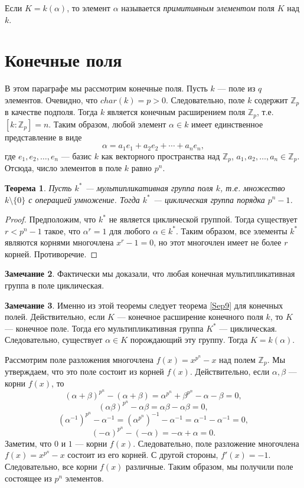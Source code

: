 \documentclass[12pt, titlepage, oneside]{amsbook}
\newcommand{\ZZ}{\mathbb{Z}}
\newtheorem{theorem}{Теорема}[chapter]
\theoremstyle{definition}
\newtheorem{remark}[theorem]{Замечание}
\theoremstyle{remark}
\begin{document}
Если $K=k(\alpha)$, то элемент $\alpha$ называется \emph{примитивным элементом} поля $K$ над $k$.

\section{Конечные поля}

В этом параграфе мы рассмотрим конечные поля. Пусть $k$ --- поле из $q$ элементов. Очевидно, что $char(k)=p>0$. Следовательно, поле $k$ содержит $\ZZ_p$ в качестве подполя. Тогда $k$ является конечным расширением поля $\ZZ_p$, т.е. $[k:\ZZ_p]=n$. Таким образом, любой элемент $\alpha\in k$ имеет единственное представление в виде $$\alpha=a_1e_1+a_2e_2+\cdots+a_ne_n,$$ где $e_1,e_2,\ldots,e_n$ --- базис $k$ как векторного пространства над $\ZZ_p$, $a_1,a_2,\ldots,a_n\in\ZZ_p$. Отсюда, число элементов в поле $k$ равно $p^n$.

\begin{theorem}
\label{Kon1}
Пусть $k^*$ --- мультипликативная группа поля $k$, т.е. множество $k\setminus\{0\}$ с операцией умножение. Тогда $k^*$ --- циклическая группа порядка $p^n-1$.
\end{theorem}

\begin{proof}
Предположим, что $k^*$ не является циклической группой. Тогда существует $r<p^n-1$ такое, что $\alpha^r=1$ для любого $\alpha\in k^*$. Таким образом, все элементы $k^*$ являются корнями многочлена $x^r-1=0$, но этот многочлен имеет не более $r$ корней. Противоречие.
\end{proof}

\begin{remark}
Фактически мы доказали, что любая конечная мультипликативная группа в поле циклическая.
\end{remark}

\begin{remark}
Именно из этой теоремы следует теорема \ref{Sep9} для конечных полей. Действительно, если $K$ --- конечное расширение конечного поля $k$, то $K$ --- конечное поле. Тогда его мультипликативная группа $K^*$ --- циклическая. Следовательно, существует $\alpha\in K$ порождающий эту группу. Тогда $K=k(\alpha)$.
\end{remark}

Рассмотрим поле разложения многочлена $f(x)=x^{p^n}-x$ над полем $\ZZ_p$. Мы утверждаем, что это поле состоит из корней $f(x)$. Действительно, если $\alpha,\beta$ --- корни $f(x)$, то $$(\alpha+\beta)^{p^n}-(\alpha+\beta)=\alpha^{p^n}+\beta^{p^n}-\alpha-\beta=0,$$ $$(\alpha\beta)^{p^n}-\alpha\beta=\alpha\beta-\alpha\beta=0,$$ $$(\alpha^{-1})^{p^n}-\alpha^{-1}=(\alpha^{p^n})^{-1}-\alpha^{-1}=\alpha^{-1}-\alpha^{-1}=0,$$ $$(-\alpha)^{p^n}-(-\alpha)=-\alpha+\alpha=0.$$ Заметим, что $0$ и $1$ --- корни $f(x)$. Следовательно, поле разложение многочлена $f(x)=x^{p^n}-x$ состоит из его корней. С другой стороны, $f'(x)=-1$. Следовательно, все корни $f(x)$ различные. Таким образом, мы получили поле состоящее из $p^n$ элементов.
\end{document}
